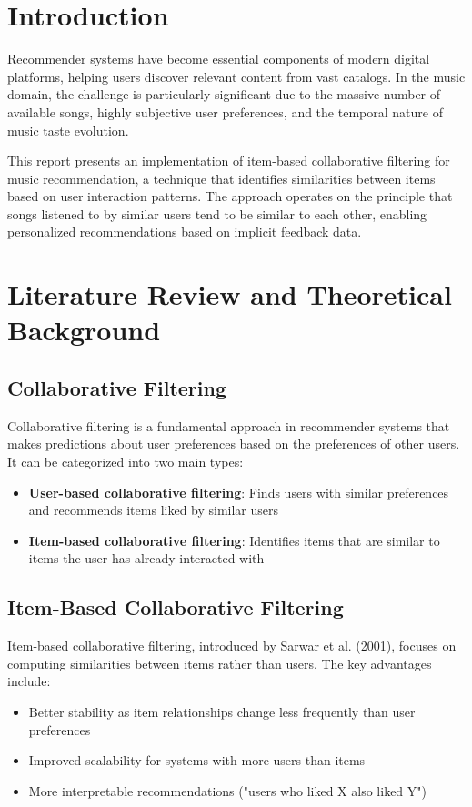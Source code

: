 \documentclass[12pt,a4paper]{article}
\begin{document}
\tableofcontents
\listoffigures
\listoftables

\newpage

\section{Introduction}

Recommender systems have become essential components of modern digital platforms, helping users discover relevant content from vast catalogs. In the music domain, the challenge is particularly significant due to the massive number of available songs, highly subjective user preferences, and the temporal nature of music taste evolution.

This report presents an implementation of item-based collaborative filtering for music recommendation, a technique that identifies similarities between items based on user interaction patterns. The approach operates on the principle that songs listened to by similar users tend to be similar to each other, enabling personalized recommendations based on implicit feedback data.

\section{Literature Review and Theoretical Background}

\subsection{Collaborative Filtering}
Collaborative filtering is a fundamental approach in recommender systems that makes predictions about user preferences based on the preferences of other users. It can be categorized into two main types:
\begin{itemize}
    \item \textbf{User-based collaborative filtering}: Finds users with similar preferences and recommends items liked by similar users
    \item \textbf{Item-based collaborative filtering}: Identifies items that are similar to items the user has already interacted with
\end{itemize}

\subsection{Item-Based Collaborative Filtering}
Item-based collaborative filtering, introduced by Sarwar et al. (2001), focuses on computing similarities between items rather than users. The key advantages include:
\begin{itemize}
    \item Better stability as item relationships change less frequently than user preferences
    \item Improved scalability for systems with more users than items
    \item More interpretable recommendations ("users who liked X also liked Y")
\end{itemize}
\end{document}
